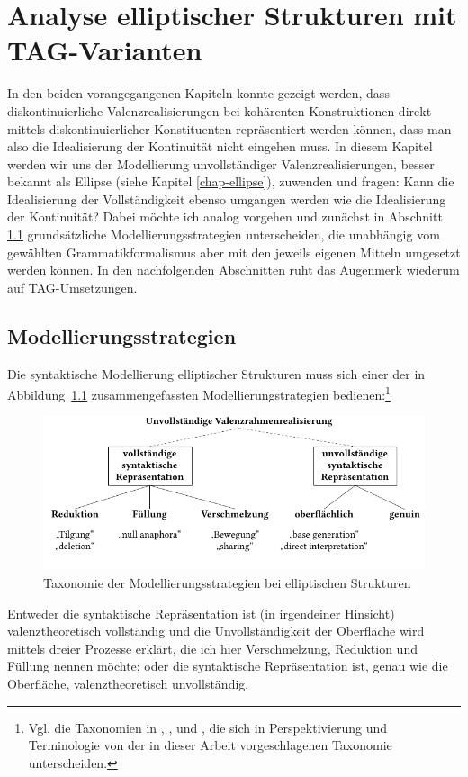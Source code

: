 \chapter{Analyse elliptischer Strukturen mit TAG-Varianten} \label{sec-ellipsenanalyse}


In den beiden vorangegangenen Kapiteln konnte gezeigt werden, dass diskontinuierliche Valenzrealisierungen bei kohärenten Konstruktionen direkt mittels diskontinuierlicher Konstituenten repräsentiert werden können, dass man also die Idealisierung der Kontinuität nicht eingehen muss. In diesem Kapitel werden wir uns der Modellierung unvollständiger Valenzrealisierungen, besser bekannt als Ellipse (siehe Kapitel \ref{chap-ellipse}), zuwenden und fragen: Kann die Idealisierung der Vollständigkeit ebenso umgangen werden wie die Idealisierung der Kontinuität? Dabei möchte ich analog vorgehen und zunächst in Abschnitt \ref{sec-ellipsenanalyse-wege} grundsätzliche Modellierungsstrategien unterscheiden, die unabhängig vom gewählten Grammatikformalismus aber mit den jeweils eigenen Mitteln umgesetzt werden können. In den nachfolgenden Abschnitten ruht das Augenmerk wiederum auf TAG-Umsetzungen. 



\section{Modellierungsstrategien} \label{sec-ellipsenanalyse-wege}

Die syntaktische Modellierung elliptischer Strukturen muss sich einer der in Abbildung~\ref{fig-ellipse-strategien} zusammengefassten Modellierungstrategien bedienen:\footnote{Vgl. die Taxonomien in \citet[768f,788f]{Klein:93}, \citet[16ff]{Schwabe:94}, \citet[5]{Winkler:Schwabe:03} und \citet[2]{Aelbrecht:10}, die sich in Perspektivierung und Terminologie von der in dieser Arbeit vorgeschlagenen Taxonomie unterscheiden.}
\begin{figure}[t]
\centering
\includegraphics{graphics/abb81.pdf}
\caption{\label{fig-ellipse-strategien}Taxonomie der Modellierungsstrategien bei elliptischen Strukturen}
\end{figure}
Entweder die syntaktische Repräsentation ist (in irgendeiner Hinsicht) valenztheoretisch vollständig und die Unvollständigkeit der Oberfläche wird mittels dreier Prozesse erklärt, die ich hier Verschmelzung, Reduktion und Füllung nennen möchte; oder die syntaktische Repräsentation ist, genau wie die Oberfläche, valenztheoretisch unvollständig.


